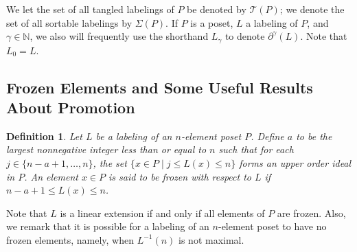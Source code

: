 \documentclass[11pt]{amsart}
\newtheorem{Definition}[thm]{Definition}
\newenvironment{definition}
{\begin{Definition}\rm}{\end{Definition}}
\theoremstyle{definition}
\newcommand{\N}{\mathbb{N}}
\newcommand{\T}{\mathcal{T}}
\newcommand{\inverse}{^{-1}}
\begin{document}
We let the set of all tangled labelings of $ P $ be denoted by $ \T(P) $; we denote the set of all {sortable} labelings by $ \Sigma(P) $. If $ P $ is a poset, $ L $ a labeling of $ P $, and $ \gamma\in\N $, we also will frequently use the shorthand $ L_\gamma $ to denote $ \partial^\gamma(L) $. Note that $ L_0 =L $. 

\subsection{Frozen Elements and Some Useful Results About Promotion}
\begin{definition}
	Let $ L $ be a labeling of an $ n $-element poset $ P $. Define $ a $ to be the largest nonnegative integer less than or equal to $ n $ such that for each $ j\in\{n-a+1,\ldots,n\} $, the set $ \{x\in P\;|\;j\leq L(x)\leq n\} $ forms an upper order ideal in $ P $. An element $ x\in P $ is said to be \emph{frozen with respect to $ L $} if $ n-a+1\leq L(x)\leq n $. 
\end{definition} 
Note that $ L $ is a linear extension if and only if all elements of $ P $ are frozen. Also, we remark that it is possible for a labeling of an $ n $-element poset to have no frozen elements, namely, when $ L\inverse(n) $ is not maximal. 
\end{document}
